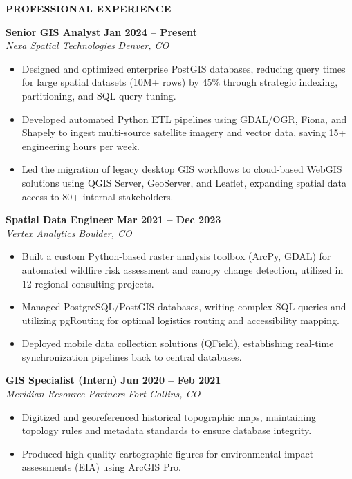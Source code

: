 \documentclass[10pt]{article}
\newcommand{\resumesection}[1]{%
  \begin{tcolorbox}[
    colback=white,
    colframe=accent,
    arc=0mm,
    outer arc=0mm,
    leftrule=3pt,
    rightrule=0pt,
    toprule=0pt,
    bottomrule=0pt,
    boxsep=0pt,
    left=6pt,
    right=0pt,
    top=2pt,
    bottom=2pt,
    before skip=6pt,
    after skip=4pt,
    boxrule=0pt,
    enhanced
  ]%
    {\color{darktext}\bfseries\large\MakeUppercase{#1}}%
  \end{tcolorbox}%
}
\begin{document}
\resumesection{Professional Experience}

\noindent
\textbf{\large\color{darktext} Senior GIS Analyst} \hfill \textbf{Jan 2024 -- Present} \\
\textit{\color{lighttext}Nexa Spatial Technologies} \hfill \textit{Denver, CO}
\begin{itemize}[leftmargin=1.2em, topsep=2pt, itemsep=1.5pt, parsep=0pt]
  \item \color{lighttext} Designed and optimized enterprise PostGIS databases, reducing query times for large spatial datasets (10M+ rows) by 45\% through strategic indexing, partitioning, and SQL query tuning.
  \item \color{lighttext} Developed automated Python ETL pipelines using GDAL/OGR, Fiona, and Shapely to ingest multi-source satellite imagery and vector data, saving 15+ engineering hours per week.
  \item \color{lighttext} Led the migration of legacy desktop GIS workflows to cloud-based WebGIS solutions using QGIS Server, GeoServer, and Leaflet, expanding spatial data access to 80+ internal stakeholders.
\end{itemize}

\vspace{4pt}
\noindent
\textbf{\large\color{darktext} Spatial Data Engineer} \hfill \textbf{Mar 2021 -- Dec 2023} \\
\textit{\color{lighttext}Vertex Analytics} \hfill \textit{Boulder, CO}
\begin{itemize}[leftmargin=1.2em, topsep=2pt, itemsep=1.5pt, parsep=0pt]
  \item \color{lighttext} Built a custom Python-based raster analysis toolbox (ArcPy, GDAL) for automated wildfire risk assessment and canopy change detection, utilized in 12 regional consulting projects.
  \item \color{lighttext} Managed PostgreSQL/PostGIS databases, writing complex SQL queries and utilizing pgRouting for optimal logistics routing and accessibility mapping.
  \item \color{lighttext} Deployed mobile data collection solutions (QField), establishing real-time synchronization pipelines back to central databases.
\end{itemize}

\vspace{4pt}
\noindent
\textbf{\large\color{darktext} GIS Specialist (Intern)} \hfill \textbf{Jun 2020 -- Feb 2021} \\
\textit{\color{lighttext}Meridian Resource Partners} \hfill \textit{Fort Collins, CO}
\begin{itemize}[leftmargin=1.2em, topsep=2pt, itemsep=1.5pt, parsep=0pt]
  \item \color{lighttext} Digitized and georeferenced historical topographic maps, maintaining topology rules and metadata standards to ensure database integrity.
  \item \color{lighttext} Produced high-quality cartographic figures for environmental impact assessments (EIA) using ArcGIS Pro.
\end{itemize}
\end{document}
